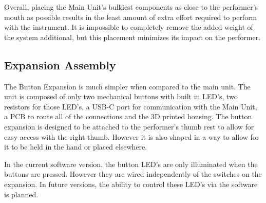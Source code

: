 
Overall, placing the Main Unit's bulkiest components as close to the performer's mouth as possible results in the least amount of extra effort required to perform with the instrument. It is impossible to completely remove the added weight of the system additional, but this placement minimizes its impact on the performer.


\subsection{Expansion Assembly}

The Button Expansion is much simpler when compared to the main unit. The unit is composed of only two mechanical buttons with built in LED's, two resistors for those LED's, a USB-C port for communication with the Main Unit, a PCB to route all of the connections and the 3D printed housing. The button expansion is designed to be attached to the performer's thumb rest to allow for easy access with the right thumb. However it is also shaped in a way to allow for it to be held in the hand or placed elsewhere.

In the current software version, the button LED's are only illuminated when the buttons are pressed. However they are wired independently of the switches on the expansion. In future versions, the ability to control these LED's via the software is planned.

